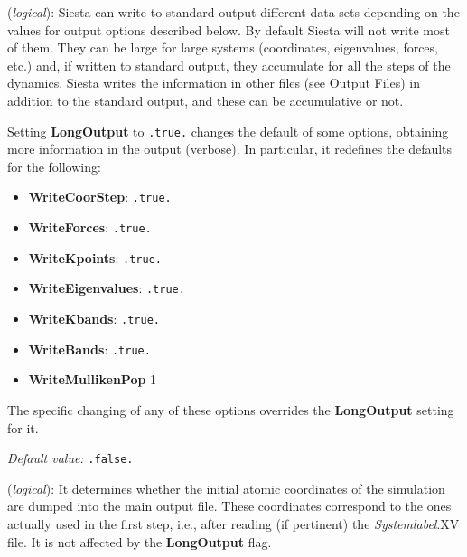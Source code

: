 \documentclass[11pt]{article}
\begin{document}
\begin{description}
\itemsep 10pt
\parsep 0pt

\item[{\bf LongOutput}] ({\it logical}):
{\sc Siesta} can write to standard output different data sets
depending on the values for output options described below.
By default {\sc Siesta} will not write most of them. They can be
large for large systems (coordinates, eigenvalues, forces, etc.)
and, if written to standard output, they accumulate for all the steps of 
the dynamics. {\sc Siesta} writes the information in other files
(see Output Files) in addition to the standard output, and these
can be accumulative or not.

Setting {\bf LongOutput} to {\tt .true.} changes the default of
some options, obtaining more information in the output (verbose).
In particular, it redefines the defaults for the following:

\begin{itemize}

\item
{\bf WriteCoorStep}:
 {\tt .true.}
\item
{\bf WriteForces}:
 {\tt .true.}
\item
{\bf WriteKpoints}:
 {\tt .true.}
\item
{\bf WriteEigenvalues}:
 {\tt .true.}
\item
{\bf WriteKbands}:
 {\tt .true.}
\item
{\bf WriteBands}:
 {\tt .true.}
\item
{\bf WriteMullikenPop} 
 1

\end{itemize}

The specific changing of any of these options overrides the
{\bf LongOutput} setting for it.

{\it Default value:} {\tt .false.}


\item[{\bf WriteCoorInitial}] ({\it logical}):
It determines whether the initial atomic coordinates of the simulation are
dumped into the main output file. These coordinates correspond to the
ones actually used in the first step, i.e., after reading (if pertinent)
the {\it Systemlabel}.XV file. It is not affected by the {\bf LongOutput}
flag.


\end{description}
\end{document}
